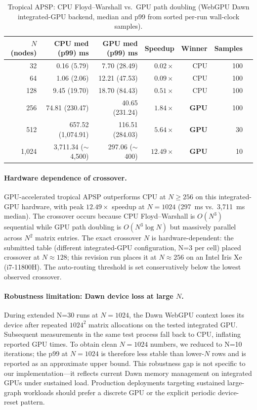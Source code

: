 \documentclass[journal]{IEEEtran}
\begin{document}
\begin{table}[t]
  \centering
  \caption{Tropical APSP: CPU Floyd--Warshall vs.\ GPU path doubling
    (WebGPU Dawn integrated-GPU backend, median and p99 from sorted
    per-run wall-clock samples).}
  \label{tab:tropical}
  \begin{tabular}{@{}rrrrrrl@{}}
    \toprule
    $N$ (nodes) & CPU med (p99) ms & GPU med (p99) ms & Speedup & Winner & Samples \\
    \midrule
       32 &      0.16 (5.79) &    7.70 (28.49) & $0.02\times$ & CPU         & 100 \\
       64 &      1.06 (2.06) &   12.21 (47.53) & $0.09\times$ & CPU         & 100 \\
      128 &      9.45 (19.70) &   18.70 (84.43) & $0.51\times$ & CPU         & 100 \\
      256 &     74.81 (230.47) &   40.65 (231.24) & $1.84\times$ & \textbf{GPU} & 100 \\
      512 &    657.52 (1{,}074.91) &  116.51 (284.03) & $5.64\times$ & \textbf{GPU} &  30 \\
    1,024 &  3{,}711.34 ($\sim$4{,}500) &  297.06 ($\sim$400)  & $12.49\times$ & \textbf{GPU} &  10 \\
    \bottomrule
  \end{tabular}
\end{table}

\paragraph{Hardware dependence of crossover.}
GPU-accelerated tropical APSP outperforms CPU at $N \geq 256$ on this
integrated-GPU hardware, with peak $12.49\times$ speedup at $N=1024$
(297~ms vs.\ 3{,}711~ms median). The crossover occurs because CPU
Floyd--Warshall is $O(N^3)$ sequential while GPU path doubling is
$O(N^3 \log N)$ but massively parallel across $N^2$ matrix entries. The
exact crossover $N$ is hardware-dependent: the submitted table (different
integrated-GPU configuration, N=3 per cell) placed crossover at
$N \approx 128$; this revision run places it at $N \approx 256$ on an
Intel Iris Xe (i7-11800H). The auto-routing threshold is set conservatively
below the lowest observed crossover.

\paragraph{Robustness limitation: Dawn device loss at large $N$.}
During extended N=30 runs at $N = 1024$, the Dawn WebGPU context loses
its device after repeated $1024^2$ matrix allocations on the tested
integrated GPU. Subsequent measurements in the same test process fall
back to CPU, inflating reported GPU times. To obtain clean $N=1024$
numbers, we reduced to N=10 iterations; the p99 at $N=1024$ is therefore
less stable than lower-$N$ rows and is reported as an approximate upper
bound. This robustness gap is not specific to our implementation---it
reflects current Dawn memory management on integrated GPUs under
sustained load. Production deployments targeting sustained large-graph
workloads should prefer a discrete GPU or the explicit periodic
device-reset pattern.
\end{document}
